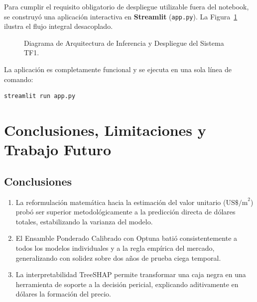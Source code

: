 \documentclass[11pt,a4paper]{article}
\begin{document}
Para cumplir el requisito obligatorio de despliegue utilizable fuera del notebook, se construyó una aplicación interactiva en \textbf{Streamlit} (\texttt{app.py}). La Figura~\ref{fig:arquitectura} ilustra el flujo integral desacoplado.

\begin{figure}[H]
\centering
{}
\caption{Diagrama de Arquitectura de Inferencia y Despliegue del Sistema TF1.}
\label{fig:arquitectura}
\end{figure}

La aplicación es completamente funcional y se ejecuta en una sola línea de comando:
\begin{lstlisting}[language=bash]
streamlit run app.py
\end{lstlisting}

\section{Conclusiones, Limitaciones y Trabajo Futuro}

\subsection{Conclusiones}
\begin{enumerate}
    \item La reformulación matemática hacia la estimación del valor unitario ($\text{US\$/m}^2$) probó ser superior metodológicamente a la predicción directa de dólares totales, estabilizando la varianza del modelo.
    \item El Ensamble Ponderado Calibrado con Optuna batió consistentemente a todos los modelos individuales y a la regla empírica del mercado, generalizando con solidez sobre dos años de prueba ciega temporal.
    \item La interpretabilidad TreeSHAP permite transformar una caja negra en una herramienta de soporte a la decisión pericial, explicando aditivamente en dólares la formación del precio.
\end{enumerate}
\end{document}
